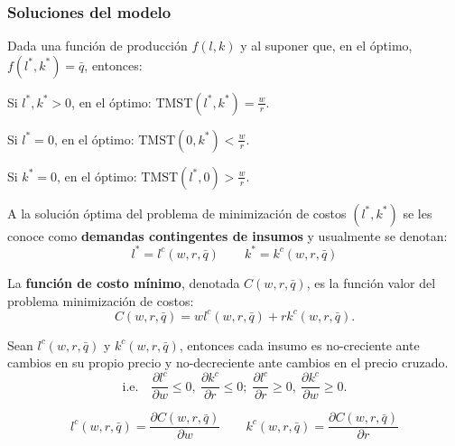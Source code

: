 \documentclass[8pt,a4paper]{extarticle}
\begin{document}
\begin{multicols}{3}
	\subsubsection*{Soluciones del modelo}

	Dada una función de producción $f(l, k)$ y al suponer que, en el óptimo, $f(l^*, k^*) = \bar{q}$, entonces:

	\begin{bulletlist}
		\item Si $l^*, k^* > 0$, en el óptimo: $\displaystyle \text{TMST} (l^*, k^*) = \frac{w}{r}$.
		\item Si $l^* = 0$, en el óptimo: $\displaystyle \text{TMST} \left(0, k^* \right) < \frac{w}{r}$.
		\item Si $k^* = 0$, en el óptimo: $\displaystyle \text{TMST} \left(l^* , 0\right) > \frac{w}{r}$.
	\end{bulletlist}

	\begin{boxdef}
		A la solución óptima del problema de minimización de costos $(l^*, k^*)$ se les conoce como \textbf{demandas contingentes de insumos} y usualmente se denotan:
		\[
			l^* = l^c (w, r, \bar{q}) \qquad k^* = k^c (w, r, \bar{q})
		\]
	\end{boxdef}

	\begin{boxdef}
		La \textbf{función de costo mínimo}, denotada $C(w, r, \bar{q})$, es la función valor del problema minimización de costos:
		\[
			C(w, r, \bar{q}) = w l^c (w, r, \bar{q}) + r k^c (w, r, \bar{q})
			.\]
	\end{boxdef}

	\begin{boxtheo}
		Sean $l^c (w, r, \bar{q})$ y $k^c (w, r, \bar{q})$, entonces cada insumo es no-creciente ante cambios en su propio precio y no-decreciente ante cambios en el precio cruzado.
		\[
			\text{i.e.}\quad \frac{\partial l^c}{\partial w} \le 0,\ \frac{\partial k^c}{\partial r} \le 0;\; \frac{\partial l^c}{\partial r} \ge 0,\ \frac{\partial k^c}{\partial w} \ge 0
			.\]
	\end{boxtheo}

	\begin{boxlemma}
		\[
			l^c (w, r, \bar{q}) = \frac{\partial C(w, r, \bar{q})}{\partial w} \qquad k^c (w, r, \bar{q}) = \frac{\partial C(w, r, \bar{q})}{\partial r}
		\]
	\end{boxlemma}


\end{multicols}
\end{document}
